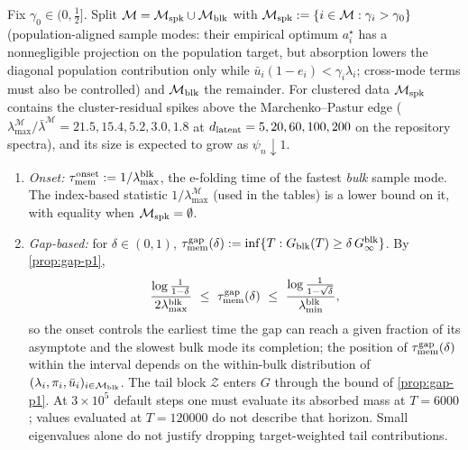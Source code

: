 \begin{definition}\label{def:taumem-p1}
Fix $\gamma_0\in(0,\tfrac12]$. Split $\mathcal M=\mathcal M_{\rm spk}\cup\mathcal M_{\rm blk}$ with $\mathcal M_{\rm spk}:=\{i\in\mathcal M:\gamma_i>\gamma_0\}$ (population-aligned sample modes: their empirical optimum $a_i^\star$ has a nonnegligible projection on the population target, but absorption lowers the diagonal population contribution only while $\bar u_i(1-e_i)<\gamma_i\lambda_i$; cross-mode terms must also be controlled) and $\mathcal M_{\rm blk}$ the remainder. For clustered data $\mathcal M_{\rm spk}$ contains the cluster-residual spikes above the Marchenko--Pastur edge ($\lambda^{\mathcal M}_{\max}/\bar\lambda^{\mathcal M}=21.5,15.4,5.2,3.0,1.8$ at $d_{\mathrm{latent}}=5,20,60,100,200$ on the repository spectra), and its size is expected to grow as $\psi_n\downarrow1$.
\begin{enumerate}
\item[(i)] \emph{Onset:} $\tau_{\mathrm{mem}}^{\rm onset}:=1/\lambda^{\rm blk}_{\max}$, the e-folding time of the fastest \emph{bulk} sample mode. The index-based statistic $1/\lambda^{\mathcal M}_{\max}$ (used in the tables) is a lower bound on it, with equality when $\mathcal M_{\rm spk}=\emptyset$.
\item[(ii)] \emph{Gap-based:} for $\delta\in(0,1)$, $\tau_{\mathrm{mem}}^{\rm gap}(\delta):=\inf\{T:G_{\rm blk}(T)\ge\delta\,G^{\rm blk}_\infty\}$. By \cref{prop:gap-p1},
\[
\frac{\log\frac1{1-\delta}}{2\lambda^{\rm blk}_{\max}}\ \le\ \taumem^{\rm gap}(\delta)\ \le\ \frac{\log\frac1{1-\sqrt\delta}}{\lambda^{\rm blk}_{\min}},
\]
so the onset controls the earliest time the gap can reach a given fraction of its asymptote and the slowest bulk mode its completion; the position of $\tau_{\mathrm{mem}}^{\rm gap}(\delta)$ within the interval depends on the within-bulk distribution of $(\lambda_i,\pi_i,\bar u_i)_{i\in\mathcal M_{\rm blk}}$. The tail block $\mathcal Z$ enters $G$ through the bound of \cref{prop:gap-p1}. At $3\times10^5$ default steps one must evaluate its absorbed mass at $T=6000$; values evaluated at $T=120000$ do not describe that horizon. Small eigenvalues alone do not justify dropping target-weighted tail contributions.


\end{enumerate}
\end{definition}
